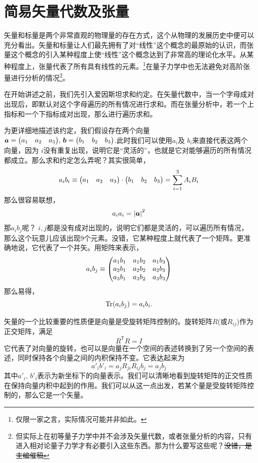 \documentclass[12pt,a4paper,openany,twoside]{book}
\numberwithin{equation}{section}
\begin{document}
      \section{简易矢量代数及张量}
        矢量和标量是两个非常直观的物理量的存在方式，这个从物理的发展历史中便可以充分看出。矢量和标量让人们最先拥有了对“线性”这个概念的最原始的认识，而张量这个概念的引入某种程度上使“线性”这个概念达到了非常高的理论化水平。从某种程度上，张量代表了所有具有线性的元素。\footnote{仅限一家之言，实际情况可能并非如此。}在量子力学中也无法避免对高阶张量进行分析的情况\footnote{但实际上在初等量子力学中并不会涉及矢量代数，或者张量分析的内容，只有进入相对论量子力学才有必要引入这些东西。那为什么要写这些呢？\sout{没错，是主编催稿}}。

        在开始讲述之前，我们先引入爱因斯坦求和约定。在矢量代数中，当一个字母成对出现后，即默认对这个字母遍历的所有情况进行求和。而在张量分析中，若一个上指标和一个下指标成对出现，那么进行遍历求和。

        为更详细地描述该约定，我们假设存在两个向量$\vb*{a} = \mqty(\xmat*{a}{1}{3}), \, \vb*{b} = \mqty(\xmat*{b}{1}{3})$.此时我们可以使用$a_i$及 $b_i$来直接代表这两个向量，因为 $i$没有重复出现，说明它是“灵活的”，也就是它对能够遍历的所有情况都成立。那么求和约定怎么弄呢？其实很简单，
        \begin{equation*}
          a_i b_i \equiv \mqty(\xmat*{a}{1}{3}) \cdot \mqty(\xmat*{b}{1}{3})  = \sum_{i=1}^3{A_iB_i}
        \end{equation*} 
        那么很容易联想，
        \begin{equation*}
          a_i a_i = \abs{\vb*{a}}^2
        \end{equation*} 
        那$a_i b_j$呢？ $i,j$都是没有成对出现的，说明它们都是灵活的，可以遍历所有情况，那么这个玩意儿应该出现9个元素。没错，它某种程度上就代表了一个矩阵。更准确地说，它代表了一个并矢。用矩阵来表示，
        \begin{equation*}
          a_i b_j\equiv\mqty(
            a_1 b_1 & a_1 b_2 & a_1 b_3 \\
            a_2 b_1 & a_2 b_2 & a_2 b_3 \\
            a_3 b_1 & a_3 b_2 & a_3 b_3 
          )
        \end{equation*} 
        那么易得，
        \begin{equation}
          \Tr(a_i b_j) = a_i b_i.
        \end{equation}

        矢量的一个比较重要的性质便是向量是受旋转矩阵控制的。旋转矩阵$R$(或$R_{ij}$)作为正交矩阵，满足
        \begin{equation*}
          R^\mathsf{T} R = I
        \end{equation*}
        它代表了对向量的旋转，也可以是向量在一个空间的表述转换到了另一个空间的表述，同时保持各个向量之间的内积保持不变。它表达起来为
        \begin{equation*}
          a'_i b'_i = a_j R_{ji} R_{ij} b_j = a_j b_j
        \end{equation*} 
        其中$a'_i,\,b'_i$表示为新坐标下的向量表示。我们可以清晰地看到旋转矩阵的正交性质在保持向量内积中起到的作用。我们可以从这一点出发，若某个量是受旋转矩阵控制的，那么它是一个矢量。
\end{document}
